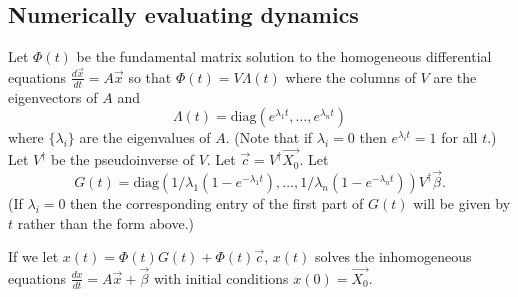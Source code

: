 \documentclass{article}
\begin{document}
\subsection{Numerically evaluating dynamics }
Let $\Phi(t)$ be the fundamental matrix solution to the homogeneous differential equations $\frac{d\vec{x}}{dt}=A\vec{x}$ so that $\Phi(t)=V\Lambda(t)$ where the columns of $V$ are the eigenvectors of $A$ and $$\Lambda(t)=\text{diag}(e^{\lambda_1 t},\dots,e^{\lambda_n t})$$ where $\{\lambda_i\}$ are the eigenvalues of $A$.  (Note that if $\lambda_i=0$ then $e^{\lambda _i t}=1$ for all $t$.) Let $V^\dagger$ be the pseudoinverse of $V$.  Let $\vec{c}=V^\dagger\vec{X_0}$.  Let $$G(t)=\text{diag}(1/\lambda_1(1-e^{-\lambda_1t}),\dots,1/\lambda_n(1-e^{-\lambda_nt}))V^\dagger\vec{\beta}.$$
(If $\lambda_i=0$ then the corresponding entry of the first part of $G(t)$ will be given by $t$ rather than the form above.)  
\begin{claim}
If we let $x(t)=\Phi(t)G(t)+\Phi(t)\vec{c}$, $x(t)$ solves the inhomogeneous equations $\frac{dx}{dt}=A\vec{x}+\vec{\beta}$ with initial conditions $x(0)=\vec{X_0}$.
\end{claim}
\end{document}
